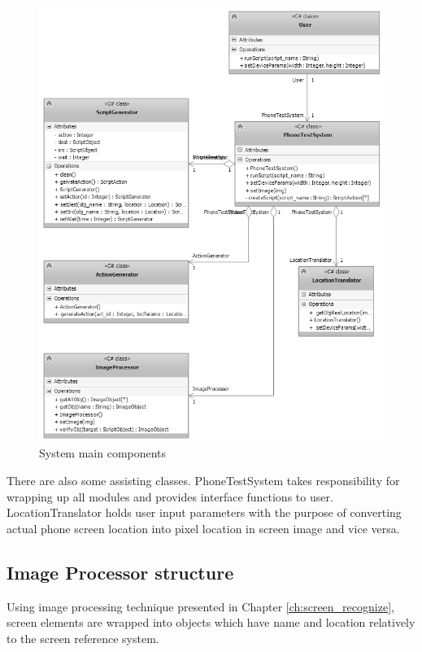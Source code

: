 	\begin{figure}[H]
		\centering
		\includegraphics[scale=0.75]{Chapters/Fig/main_class.png}
		\caption{System main components}
		\label{fig:main_class}
	\end{figure}

There are also some assisting classes. PhoneTestSystem takes responsibility for wrapping up all modules and provides interface functions to user. LocationTranslator holds user input parameters with the purpose of converting actual phone screen location into pixel location in screen image and vice versa.

\subsection{Image Processor structure}
Using image processing technique presented in Chapter \ref{ch:screen_recognize}, screen elements are wrapped into objects which have name and location relatively to the screen reference system.

